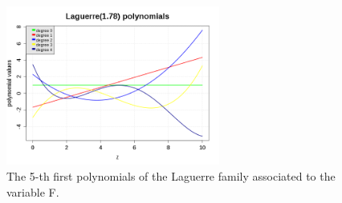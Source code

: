 \documentclass[11pt]{article}
\begin{document}
\begin{figure}[Hhbtp]
\begin{minipage}{9cm}
\begin{center}
      \else
      \includegraphics[width=7cm]{PCE_LaguerrePolynomials_VariableF.png}
      \fi
      \caption{The 5-th first polynomials of the Laguerre family associated to the variable F.}
      \label{PCE_F}
    \end{center}
  \end{minipage}
\end{figure}
\end{document}
